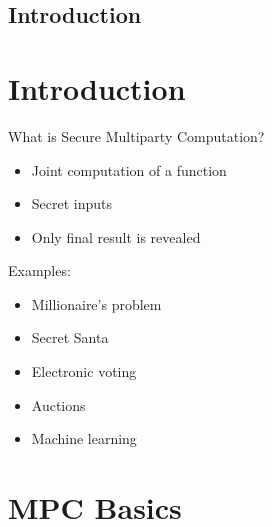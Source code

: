 \section{Introduction}

\hypertarget{introduction}{%
\chapter{Introduction}\label{introduction}}

What is Secure Multiparty Computation?

\begin{itemize}
\tightlist
\item
  Joint computation of a function
\item
  Secret inputs
\item
  Only final result is revealed
\end{itemize}

Examples:

\begin{itemize}
\tightlist
\item
  Millionaire's problem
\item
  Secret Santa
\item
  Electronic voting
\item
  Auctions
\item
  Machine learning
\end{itemize}

\hypertarget{mpc-basics}{%
\chapter{MPC Basics}\label{mpc-basics}}

